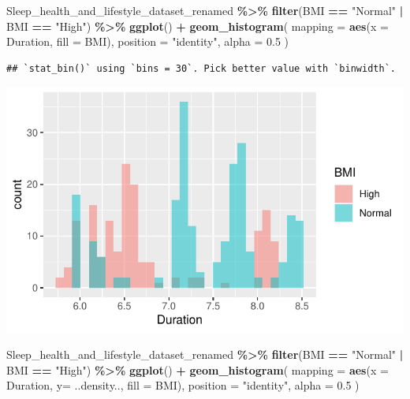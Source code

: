 \documentclass[
  11pt,
]{article}
\newenvironment{Shaded}{\begin{snugshade}}{\end{snugshade}}
\newcommand{\AttributeTok}[1]{\textcolor[rgb]{0.13,0.29,0.53}{#1}}
\newcommand{\FloatTok}[1]{\textcolor[rgb]{0.00,0.00,0.81}{#1}}
\newcommand{\FunctionTok}[1]{\textcolor[rgb]{0.13,0.29,0.53}{\textbf{#1}}}
\newcommand{\NormalTok}[1]{#1}
\newcommand{\SpecialCharTok}[1]{\textcolor[rgb]{0.81,0.36,0.00}{\textbf{#1}}}
\newcommand{\StringTok}[1]{\textcolor[rgb]{0.31,0.60,0.02}{#1}}
\begin{document}
\begin{Shaded}
\begin{Highlighting}[]
\NormalTok{Sleep\_health\_and\_lifestyle\_dataset\_renamed }\SpecialCharTok{\%\textgreater{}\%}
  \FunctionTok{filter}\NormalTok{(BMI }\SpecialCharTok{==} \StringTok{"Normal"} \SpecialCharTok{|}\NormalTok{ BMI }\SpecialCharTok{==} \StringTok{"High"}\NormalTok{) }\SpecialCharTok{\%\textgreater{}\%}
  \FunctionTok{ggplot}\NormalTok{() }\SpecialCharTok{+}
  \FunctionTok{geom\_histogram}\NormalTok{( }
    \AttributeTok{mapping =} \FunctionTok{aes}\NormalTok{(}\AttributeTok{x =}\NormalTok{ Duration, }\AttributeTok{fill =}\NormalTok{ BMI), }
    \AttributeTok{position =} \StringTok{"identity"}\NormalTok{,}
\AttributeTok{alpha =} \FloatTok{0.5}
\NormalTok{  )}
\end{Highlighting}
\end{Shaded}

\begin{verbatim}
## `stat_bin()` using `bins = 30`. Pick better value with `binwidth`.
\end{verbatim}

\begin{center}\includegraphics[width=0.7\linewidth]{SleepHelath_files/figure-latex/unnamed-chunk-18-1} \end{center}

\begin{Shaded}
\begin{Highlighting}[]
\NormalTok{Sleep\_health\_and\_lifestyle\_dataset\_renamed }\SpecialCharTok{\%\textgreater{}\%}
  \FunctionTok{filter}\NormalTok{(BMI }\SpecialCharTok{==} \StringTok{"Normal"} \SpecialCharTok{|}\NormalTok{ BMI }\SpecialCharTok{==} \StringTok{"High"}\NormalTok{) }\SpecialCharTok{\%\textgreater{}\%}
  \FunctionTok{ggplot}\NormalTok{() }\SpecialCharTok{+}
  \FunctionTok{geom\_histogram}\NormalTok{( }
    \AttributeTok{mapping =} \FunctionTok{aes}\NormalTok{(}\AttributeTok{x =}\NormalTok{ Duration, }\AttributeTok{y=}\NormalTok{ ..density.., }\AttributeTok{fill =}\NormalTok{ BMI), }
    \AttributeTok{position =} \StringTok{"identity"}\NormalTok{,}
\AttributeTok{alpha =} \FloatTok{0.5}
\NormalTok{  )}
\end{Highlighting}
\end{Shaded}
\end{document}
